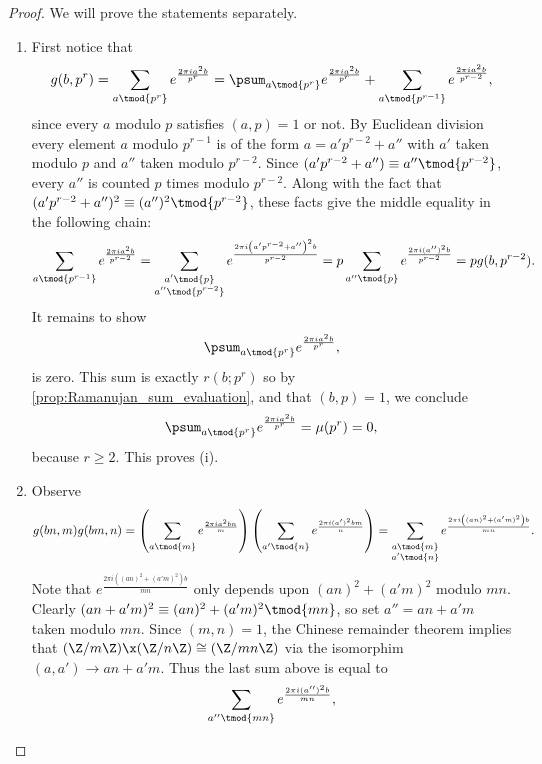         \begin{proof}
          We will prove the statements separately.
          \begin{enumerate}[label=(\roman*)]
            \item First notice that
            \[
              g(b,p^{r}) = \sum_{a \tmod{p^{r}}}e^{\frac{2\pi ia^{2}b}{p^{r}}} = \psum_{a \tmod{p^{r}}}e^{\frac{2\pi ia^{2}b}{p^{r}}}+\sum_{a \tmod{p^{r-1}}}e^{\frac{2\pi ia^{2}b}{p^{r-2}}},
            \]
            since every $a$ modulo $p$ satisfies $(a,p) = 1$ or not. By Euclidean division every element $a$ modulo $p^{r-1}$ is of the form $a = a'p^{r-2}+a''$ with $a'$ taken modulo $p$ and $a''$ taken modulo $p^{r-2}$. Since $(a'p^{r-2}+a'') \equiv a'' \tmod{p^{r-2}}$, every $a''$ is counted $p$ times modulo $p^{r-2}$. Along with the fact that $(a'p^{r-2}+a'')^{2} \equiv (a'')^{2} \tmod{p^{r-2}}$, these facts give the middle equality in the following chain:
            \[
              \sum_{a \tmod{p^{r-1}}}e^{\frac{2\pi ia^{2}b}{p^{r-2}}} = \sum_{\substack{a' \tmod{p} \\ a'' \tmod{p^{r-2}}}}e^{\frac{2\pi i\left(a'p^{r-2}+a''\right)^{2}b}{p^{r-2}}} = p\sum_{a'' \tmod{p}}e^{\frac{2\pi i(a'')^{2}b}{p^{r-2}}} = pg(b,p^{r-2}).
            \]
            It remains to show
            \[
              \psum_{a \tmod{p^{r}}}e^{\frac{2\pi ia^{2}b}{p^{r}}},
            \]
            is zero. This sum is exactly $r(b;p^{r})$ so by \cref{prop:Ramanujan_sum_evaluation}, and that $(b,p) = 1$, we conclude
            \[
              \psum_{a \tmod{p^{r}}}e^{\frac{2\pi ia^{2}b}{p^{r}}} = \mu(p^{r}) = 0,
            \]
            because $r \ge 2$. This proves (i).
            \item Observe
              \[
                g(bn,m)g(bm,n) = \left(\sum_{a \tmod{m}}e^{\frac{2\pi ia^{2}bn}{m}}\right)\left(\sum_{a' \tmod{n}}e^{\frac{2\pi i(a')^{2}bm}{n}}\right) = \sum_{\substack{a \tmod{m} \\ a' \tmod{n}}}e^{\frac{2\pi i\left((an)^{2}+(a'm)^{2}\right)b}{mn}}.
              \]
              Note that $e^{\frac{2\pi i\left((an)^{2}+(a'm)^{2}\right)b}{mn}}$ only depends upon $(an)^{2}+(a'm)^{2}$ modulo $mn$. Clearly $(an+a'm)^{2} \equiv (an)^{2}+(a'm)^{2} \tmod{mn}$, so set $a'' = an+a'm$ taken modulo $mn$. Since $(m,n) = 1$, the Chinese remainder theorem implies that $(\Z/m\Z) \x (\Z/n\Z) \cong (\Z/mn\Z)$ via the isomorphim $(a,a') \to an+a'm$. Thus the last sum above is equal to
              \[
                \sum_{a'' \tmod{mn}}e^{\frac{2\pi i(a'')^{2}b}{mn}},
              \]

\end{enumerate}
\end{proof}
